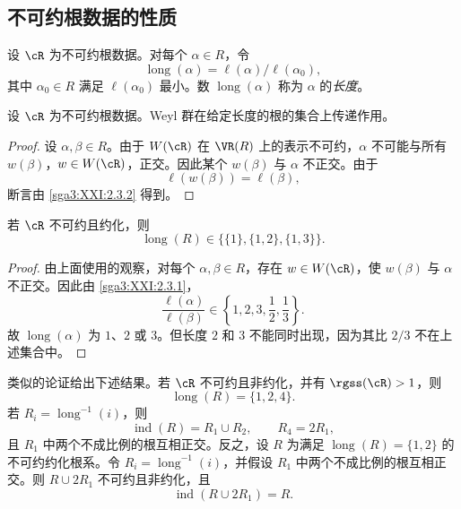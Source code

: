 \subsection{不可约根数据的性质}
\label{sga3:XXI:7.2}

\begin{definition}\label{sga3:XXI:7.2.1}
设 \(\cR\) 为不可约根数据。对每个 \(\alpha\in R\)，令
\[
 \operatorname{long}(\alpha)
 =\ell(\alpha)/\ell(\alpha_0),
\]
其中 \(\alpha_0\in R\) 满足 \(\ell(\alpha_0)\) 最小。数 \(\operatorname{long}(\alpha)\) 称为 \(\alpha\) 的\emph{长度}。
\end{definition}

\begin{lemma}\label{sga3:XXI:7.2.2}
设 \(\cR\) 为不可约根数据。Weyl 群在给定长度的根的集合上传递作用。
\end{lemma}

\begin{proof}
设 \(\alpha,\beta\in R\)。由于 \(W(\cR)\) 在 \(\VR(R)\) 上的表示不可约，\(\alpha\) 不可能与所有 \(w(\beta)\)，\(w\in W(\cR)\)，正交。因此某个 \(w(\beta)\) 与 \(\alpha\) 不正交。由于
\[
 \ell(w(\beta))=\ell(\beta),
\]
断言由 \ref{sga3:XXI:2.3.2} 得到。
\end{proof}

\begin{lemma}\label{sga3:XXI:7.2.3}
若 \(\cR\) 不可约且约化，则
\[
 \operatorname{long}(R)
 \in\bigl\{\{1\},\{1,2\},\{1,3\}\bigr\}.
\]
\end{lemma}

\begin{proof}
由上面使用的观察，对每个 \(\alpha,\beta\in R\)，存在 \(w\in W(\cR)\)，使 \(w(\beta)\) 与 \(\alpha\) 不正交。因此由 \ref{sga3:XXI:2.3.1}，
\[
 \frac{\ell(\alpha)}{\ell(\beta)}
 \in\left\{1,2,3,\frac12,\frac13\right\}.
\]
故 \(\operatorname{long}(\alpha)\) 为 \(1\)、\(2\) 或 \(3\)。但长度 \(2\) 和 \(3\) 不能同时出现，因为其比 \(2/3\) 不在上述集合中。
\end{proof}

\begin{remark}\label{sga3:XXI:7.2.4}
类似的论证给出下述结果。若 \(\cR\) 不可约且非约化，并有 \(\rgss(\cR)>1\)，则
\[
 \operatorname{long}(R)=\{1,2,4\}.
\]
若 \(R_i=\operatorname{long}^{-1}(i)\)，则
\[
 \operatorname{ind}(R)=R_1\cup R_2,\qquad R_4=2R_1,
\]
且 \(R_1\) 中两个不成比例的根互相正交。反之，设 \(R\) 为满足 \(\operatorname{long}(R)=\{1,2\}\) 的不可约约化根系。令 \(R_i=\operatorname{long}^{-1}(i)\)，并假设 \(R_1\) 中两个不成比例的根互相正交。则 \(R\cup2R_1\) 不可约且非约化，且
\[
 \operatorname{ind}(R\cup2R_1)=R.
\]
\end{remark}


